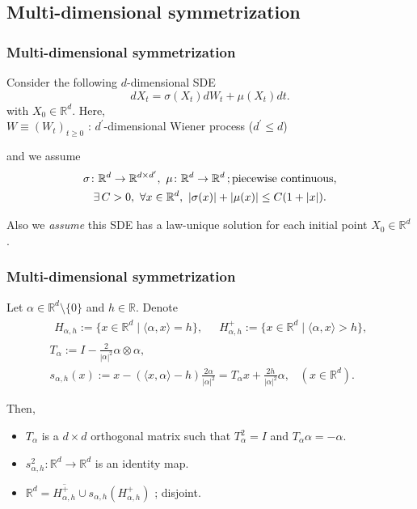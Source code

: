 \documentclass[dvipdfmx,11pt]{beamer}		%
\newcommand{\R}{\mathbb{R}}
\begin{document}
\subsection{Multi-dimensional symmetrization}
%
\begin{frame}\frametitle{Multi-dimensional symmetrization}
	Consider the following \(d\)-dimensional SDE
	\[
		dX_t = \sigma(X_t)dW_t + \mu(X_t)dt	\text{.}
	\]
	with \( X_0 \in \R^d \). Here,\\
	\( W \equiv (W_t)_{t\ge0} \) : \(d^{\prime}\)-dimensional Wiener process (\(d^{\prime} \le d\))

	and we assume
	\[
		\begin{gathered}
			\sigma\colon \R^d \to \R^{ d \times d^\prime },\ \mu \colon \R^d \to \R^d \text{\,;\,piecewise continuous,}\\
			\exists\, C > 0,\ \forall x \in \R^d,\ |\sigma(x)| + |\mu(x)| \le C( 1+ |x| )\text{.}
		\end{gathered}
	\]
	
	{\quad}Also we \emph{assume} this SDE has a law-unique solution for each initial point \( X_0 \in \R^d \).
\end{frame}
%
\begin{frame}\frametitle{Multi-dimensional symmetrization}
	Let \( \alpha \in \R^d \setminus \{ 0 \} \) and \( h \in \R \). Denote
	\begin{gather*}
		\begin{aligned}
		H_{\alpha,h} := \{ x\in \R^d \mid \langle \alpha, x \rangle = h \}\text{,} && H_{\alpha,h}^+ := \{ x\in \R^d \mid \langle \alpha, x \rangle > h \}\text{,}
		\end{aligned}	\\
		T_\alpha := I - \frac{2}{|\alpha|^2} \alpha \otimes \alpha	\text{,}\\
		s_{\alpha, h}(x) := x - ( \langle x,\alpha \rangle - h ) \frac{ 2\alpha }{ |\alpha|^2 } = T_\alpha x + \frac{2h}{|\alpha|^2} \alpha	\text{,}\quad	( x \in \R^d )\text{.}
	\end{gather*}
	
	Then,
	\begin{itemize}
	\item \( T_\alpha \) is a \( d \times d \) orthogonal matrix such that \( T_\alpha^2 = I \) and \( T_\alpha \alpha = -\alpha \).
	\item \( s_{\alpha,h}^2 \colon \R^d \to \R^d \) is an identity map.
	\item \( \R^d = \overline{ H_{\alpha,h}^+ } \cup s_{\alpha,h}( H_{\alpha,h}^+ ) \) ; disjoint.
	\end{itemize}
\end{frame}
\end{document}
